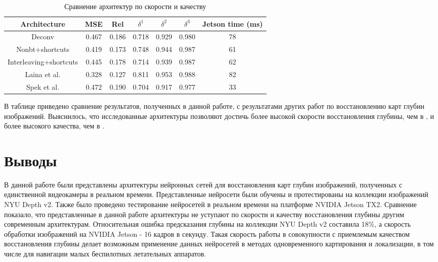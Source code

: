 \documentclass{mipt-thesis-bs}
\begin{document}
\tabcolsep=0.11cm
\begin{table*}[ht]
	\caption{Сравнение архитектур по скорости и качеству}
	\label{table_evaluation}
	\begin{center}
		\begin{tabular}{|c||c|c|c|c|c|c|}
			\hline
			Architecture & MSE & Rel & $\delta^1$ & $\delta^2$ & $\delta^3$ & Jetson time (ms)\\
			\hline
			\hline
			Deconv & 0.467 & 0.186 & 0.718 & 0.929 & 0.980 & 78\\
			Nonbt+shortcuts & 0.419 & 0.173 & 0.748 & 0.944 & 0.987 & 61\\
			Interleaving+shortcuts & 0.445 & 0.178 & 0.714 & 0.939 & 0.987 & 62\\
			\hline
			Laina et al. \cite{laina2016deeper} & 0.328 & 0.127 & 0.811 & 0.953 & 0.988 & 82\\
			Spek et al. \cite{spek2018cream} & 0.472 & 0.190 & 0.704 & 0.917 & 0.977 & 33\\
			\hline
		\end{tabular}
	\end{center}
\end{table*}

В таблице приведено сравнение результатов, полученных в данной работе, с результатами других работ по восстановлению карт глубин изображений. Выяснилось, что исследованные архитектуры позволяют достичь более высокой скорости восстановления глубины, чем в \cite{laina2016deeper}, и более высокого качества, чем в \cite{spek2018cream}.

\section{Выводы}
В данной работе были представлены архитектуры нейронных сетей для восстановления карт глубин изображений, полученных с единственной видеокамеры в реальном времени. Представленные нейросети были обучены и протестированы на коллекции изображений NYU Depth v2. Также было проведено тестирование нейросетей в реальном времени на платформе NVIDIA Jetson TX2. Сравнение показало, что представленные в данной работе архитектуры не уступают по скорости и качеству восстановления глубины другим современным архитектурам. Относительная ошибка предсказания глубины на коллекции NYU Depth v2 составила 18\%, а скорость обработки изображений на NVIDIA Jetson - 16 кадров в секунду. Такая скорость работы в совокупности с приемлемым качеством восстановления глубины делает возможным применение данных нейросетей в методах одновременного картирования и локализации, в том числе для навигации малых беспилотных летательных аппаратов.
\end{document}

